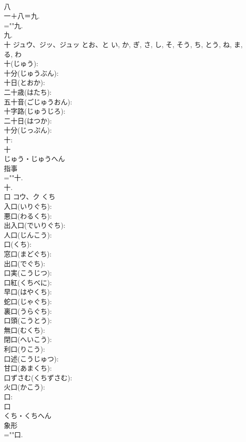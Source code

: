 \documentclass[8pt]{extreport}
\begin{document}
\begin{CJK}{UTF8}{min}
\\	八
\\	一＋八＝九.	
\\	=""九.
\\	九.
\\	十	ジュウ、ジッ、ジュッ	とお、と	い, か, ぎ, さ, し, そ, そう, ち, とう, ね, ま, る, わ	
\\	十(じゅう): 
\\	十分(じゅうぶん): 
\\	十日(とおか): 
\\	二十歳(はたち): 
\\	五十音(ごじゅうおん): 
\\	十字路(じゅうじろ): 
\\	二十日(はつか): 
\\	十分(じっぷん): 
\\	十: 
\\	十	
\\	じゅう・じゅうへん	
\\	指事 
\\	=""十.
\\	十.
\\	口	コウ、ク	くち		
\\	入口(いりぐち): 
\\	悪口(わるくち): 
\\	出入口(でいりぐち): 
\\	人口(じんこう): 
\\	口(くち): 
\\	窓口(まどぐち): 
\\	出口(でぐち): 
\\	口実(こうじつ): 
\\	口紅(くちべに): 
\\	早口(はやくち): 
\\	蛇口(じゃぐち): 
\\	裏口(うらぐち): 
\\	口頭(こうとう): 
\\	無口(むくち): 
\\	閉口(へいこう): 
\\	利口(りこう): 
\\	口述(こうじゅつ): 
\\	甘口(あまくち): 
\\	口ずさむ(くちずさむ): 
\\	火口(かこう): 
\\	口: 
\\	口	
\\	くち・くちへん	
\\	象形 
\\	=""口.

\end{CJK}
\end{document}
